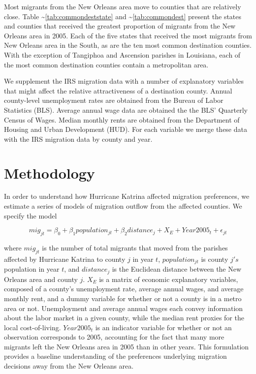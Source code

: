 \documentclass[]{article}
\begin{document}
Most migrants from the New Orleans area move to counties that are
relatively close. Table \textasciitilde{}\ref{tab:commondeststate} and
\textasciitilde{}\ref{tab:commondest} present the states and counties
that received the greatest proportion of migrants from the New Orleans
area in 2005. Each of the five states that received the most migrants
from New Orleans area in the South, as are the ten most common
destination counties. With the exception of Tangiphoa and Ascension
parishes in Louisiana, each of the most common destination counties
contain a metropolitan area.

We supplement the IRS migration data with a number of explanatory
variables that might affect the relative attractiveness of a destination
county. Annual county-level unemployment rates are obtained from the
Bureau of Labor Statistics (BLS). Average annual wage data are obtained
the the BLS' Quarterly Census of Wages. Median monthly rents are
obtained from the Department of Housing and Urban Development (HUD). For
each variable we merge these data with the IRS migration data by county
and year.

\section{\texorpdfstring{Methodology
\label{sec:meth}}{Methodology }}\label{methodology}

In order to understand how Hurricane Katrina affected migration
preferences, we estimate a series of models of migration outflow from
the affected counties. We specify the model

\begin{equation} \label{eq:basereg}
    mig_{jt} = \beta_0 + \beta_1 population_{jt} + \beta_2 distance_j + X_E + Year2005_t + \epsilon_{jt}
\end{equation}

where \(mig_{jt}\) is the number of total migrants that moved from the
parishes affected by Hurricane Katrina to county \(j\) in year \(t\),
\(population_{jt}\) is county \(j's\) population in year \(t\), and
\(distance_j\) is the Euclidean distance between the New Orleans area
and county \(j\). \(X_E\) is a matrix of economic explanatory variables,
composed of a county's unemployment rate, average annual wages, and
average monthly rent, and a dummy variable for whether or not a county
is in a metro area or not. Unemployment and average annual wages each
convey information about the labor market in a given county, while the
median rent proxies for the local cost-of-living. \(Year2005_t\) is an
indicator variable for whether or not an observation corresponds to
2005, accounting for the fact that many more migrants left the New
Orleans area in 2005 than in other years. This formulation provides a
baseline understanding of the preferences underlying migration decisions
away from the New Orleans area.
\end{document}

